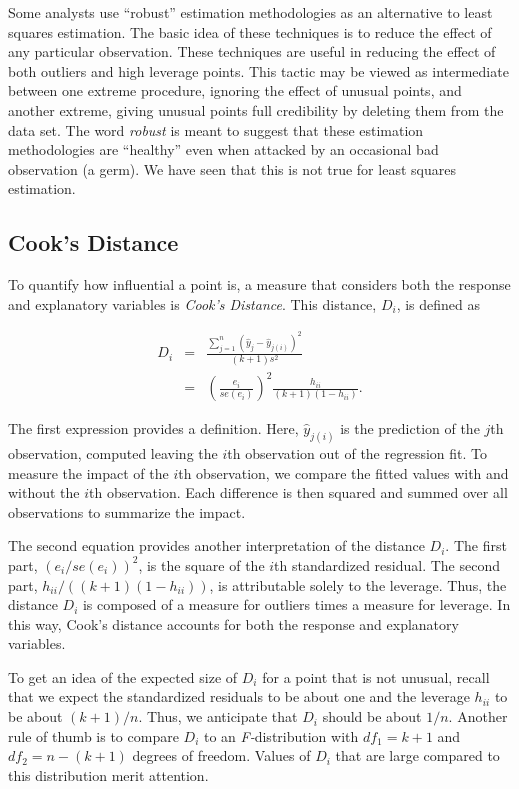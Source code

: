 Some analysts use ``robust'' estimation methodologies as an
alternative to least squares estimation. The basic idea of these
techniques is to reduce the effect of any particular observation.
These techniques are useful in reducing the effect of both outliers
and high leverage points. This tactic may be viewed as intermediate
between one extreme procedure, ignoring the effect of unusual
points, and another extreme, giving unusual points full credibility
by deleting them from the data set. The word \textit{robust }is
meant to suggest that these estimation methodologies are ``healthy''
even when attacked by an occasional bad observation (a germ). We
have seen that this is not true for least squares
estimation.

\subsection{Cook's Distance}

To quantify how influential a point is, a measure that considers
both the response and explanatory variables is \textit{Cook's
Distance}. This distance, $D_i$, is defined as

\begin{eqnarray}\label{E5:CooksD}
D_i &=&\frac{\sum_{j=1}^{n}(\hat{y}_j-\hat{y}_{j(i)})^2}{(k+1)s^2} \\
&=&\left(\frac{e_i}{se(e_i)}\right)^2\frac{h_{ii}}{(k+1)(1-h_{ii})}.
\nonumber
\end{eqnarray}

\noindent The first expression provides a definition. Here,
$\hat{y}_{j(i)}$ is the prediction of the $j$th observation,
computed leaving the $i$th observation out of the regression fit. To
measure the impact of the $i$th observation, we compare the fitted
values with and without the $i$th observation. Each difference is
then squared and summed over all observations to summarize the
impact.

The second equation provides another interpretation of the distance
$D_i$. The first part, $(e_i/se(e_i))^2$, is the square of the $i$th
standardized residual. The second part, $h_{ii}/((k+1)(1-h_{ii}))$,
is attributable solely to the leverage. Thus, the distance $D_i$ is
composed of a measure for outliers times a measure for leverage. In
this way, Cook's distance accounts for both the response and
explanatory variables.

To get an idea of the expected size of $D_i$ for a point that is not
unusual, recall that we expect the standardized residuals to be
about one
and the leverage $h_{ii}$ to be about $(k+1)/n$. Thus, we anticipate that $%
D_i$ should be about $1/n$. Another rule of thumb is to compare
$D_i$ to an \textit{F-}distribution with $df_1=k+1$ and
$df_2=n-(k+1)$ degrees of freedom. Values of $D_i$ that are large
compared to this distribution merit attention.

